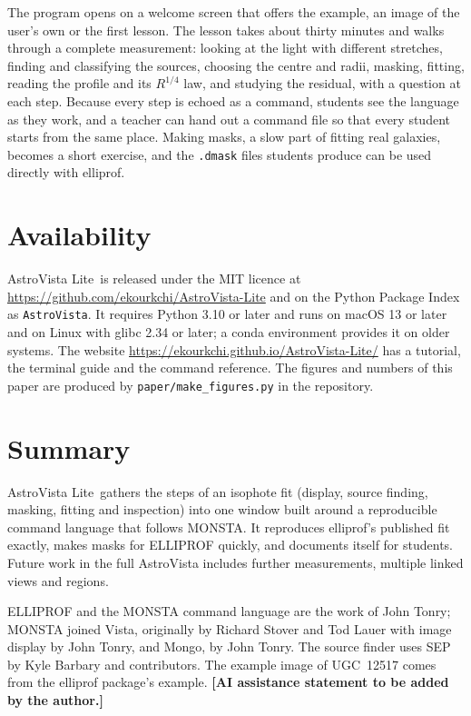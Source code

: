 \documentclass[twocolumn]{aastex701}
\newcommand{\avl}{AstroVista Lite}
\newcommand{\code}[1]{\texttt{#1}}
\begin{document}
The program opens on a welcome screen that offers the example, an image of the user's own
or the first lesson. The lesson takes about thirty minutes and walks through a complete
measurement: looking at the light with different stretches, finding and classifying the
sources, choosing the centre and radii, masking, fitting, reading the profile and its
$R^{1/4}$ law, and studying the residual, with a question at each step. Because every step
is echoed as a command, students see the language as they work, and a teacher can hand out
a command file so that every student starts from the same place. Making masks, a slow
part of fitting real galaxies, becomes a short exercise, and the \code{.dmask} files
students produce can be used directly with elliprof.

\section{Availability} \label{sec:availability}

\avl\ is released under the MIT licence at \url{https://github.com/ekourkchi/AstroVista-Lite}
and on the Python Package Index as \code{AstroVista}. It requires Python 3.10 or later and
runs on macOS 13 or later and on Linux with glibc 2.34 or later; a conda environment
provides it on older systems. The website \url{https://ekourkchi.github.io/AstroVista-Lite/}
has a tutorial, the terminal guide and the command reference. The figures and numbers of
this paper are produced by \code{paper/make\_figures.py} in the repository.

\section{Summary} \label{sec:summary}

\avl\ gathers the steps of an isophote fit (display, source finding, masking, fitting and
inspection) into one window built around a reproducible command language that follows
MONSTA. It reproduces elliprof's published fit exactly, makes masks for ELLIPROF quickly,
and documents itself for students. Future work in the full AstroVista includes further
measurements, multiple linked views and regions.

\begin{acknowledgments}
ELLIPROF and the MONSTA command language are the work of John Tonry; MONSTA joined Vista,
originally by Richard Stover and Tod Lauer with image display by John Tonry, and Mongo, by
John Tonry. The source finder uses SEP by Kyle Barbary and contributors. The example image
of UGC~12517 comes from the elliprof package's example.
\textbf{[AI assistance statement to be added by the author.]}
\end{acknowledgments}
\end{document}
